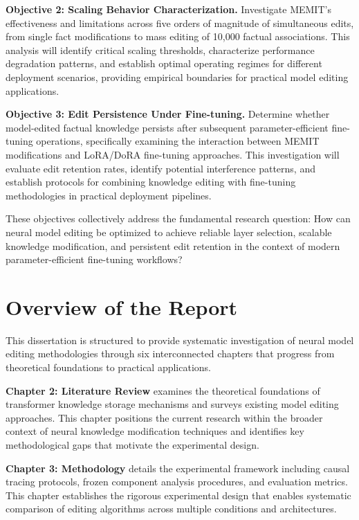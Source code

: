 \textbf{Objective 2: Scaling Behavior Characterization.} Investigate MEMIT's effectiveness and limitations across five orders of magnitude of simultaneous edits, from single fact modifications to mass editing of 10,000 factual associations. This analysis will identify critical scaling thresholds, characterize performance degradation patterns, and establish optimal operating regimes for different deployment scenarios, providing empirical boundaries for practical model editing applications.

\textbf{Objective 3: Edit Persistence Under Fine-tuning.} Determine whether model-edited factual knowledge persists after subsequent parameter-efficient fine-tuning operations, specifically examining the interaction between MEMIT modifications and LoRA/DoRA fine-tuning approaches. This investigation will evaluate edit retention rates, identify potential interference patterns, and establish protocols for combining knowledge editing with fine-tuning methodologies in practical deployment pipelines.

These objectives collectively address the fundamental research question: How can neural model editing be optimized to achieve reliable layer selection, scalable knowledge modification, and persistent edit retention in the context of modern parameter-efficient fine-tuning workflows?

\section{Overview of the Report}
\label{sec:report_overview}

This dissertation is structured to provide systematic investigation of neural model editing methodologies through six interconnected chapters that progress from theoretical foundations to practical applications.

\textbf{Chapter 2: Literature Review} examines the theoretical foundations of transformer knowledge storage mechanisms and surveys existing model editing approaches. This chapter positions the current research within the broader context of neural knowledge modification techniques and identifies key methodological gaps that motivate the experimental design.

\textbf{Chapter 3: Methodology} details the experimental framework including causal tracing protocols, frozen component analysis procedures, and evaluation metrics. This chapter establishes the rigorous experimental design that enables systematic comparison of editing algorithms across multiple conditions and architectures.

